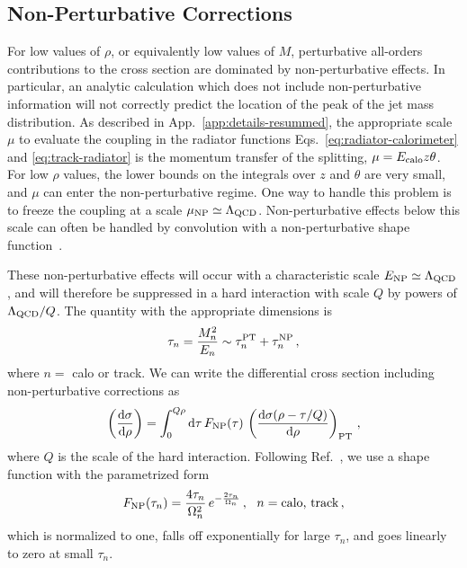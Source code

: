 \documentclass[letterpaper,11pt]{article}
\newcommand{\Ref}[1]{Ref.~\cite{#1}}
\newcommand{\App}[1]{App.~\ref{#1}}
\newcommand{\Eqs}[2]{Eqs.~\eqref{#1} and \eqref{#2}}
\begin{document}

\subsection{Non-Perturbative Corrections}
\label{sec:calculation-np}


For low values of $\rho$, or equivalently low values of $M$, perturbative all-orders contributions to the cross section are dominated by non-perturbative effects. 
%
In particular, an analytic calculation which does not include non-perturbative information will not correctly predict the location of the peak of the jet mass distribution. 
As described in \App{app:details-resummed}, the appropriate scale $\mu$ to evaluate the coupling in the radiator functions \Eqs{eq:radiator-calorimeter}{eq:track-radiator} is the momentum transfer of the splitting, $\mu = E_{\rm calo}z\theta$. 
%
For low $\rho$ values, the lower bounds on the integrals over $z$ and $\theta$ are very small, and $\mu$ can enter the non-perturbative regime. 
%
One way to handle this problem is to freeze the coupling at a scale $\mu_{\rm NP} \simeq \Lambda_{\rm QCD}$. 
%
Non-perturbative effects below this scale can often be handled by convolution with a non-perturbative shape function~\cite{Manohar:1994kq,Dokshitzer:1995zt,Korchemsky:1999kt,Korchemsky:2000kp,Salam:2001bd,Lee:2006nr,Hoang:2007vb,Mateu:2012nk,Stewart:2014nna}. 


These non-perturbative effects will occur with a characteristic scale $E_{\rm NP} \simeq \Lambda_{\rm QCD}$, and will therefore be suppressed in a hard interaction with scale $Q$ by powers of $\Lambda_{\rm QCD}/Q$. 
%
The quantity with the appropriate dimensions is
\begin{equation}
\label{eq:tau-defn}
\tau_n = \frac{M_n^2}{E_n} \sim \tau_n^{\rm PT} + \tau_n^{\rm NP}\,,
\end{equation}
where $n = $ calo or track.
%
We can write the differential cross section including non-perturbative corrections as
\begin{equation}
\label{eq:shape-fcn-convolution}
\left(\frac{\text{d}\sigma}{\text{d}\rho}\right) = \int_0^{Q\rho} \text{d}\tau \,  F_{\rm NP}(\tau) \, \left(\frac{\text{d}\sigma(\rho -\tau/Q)}{\text{d}\rho}\right)_{\rm PT}\,,
\end{equation}
where $Q$ is the scale of the hard interaction. 
%
Following \Ref{Stewart:2014nna}, we use a shape function with the parametrized form 
\begin{equation}
\label{eq:shape-functions}
F_{\rm NP}(\tau_n) = \frac{4\tau_n}{\Omega_n^2}\, e^{-\frac{2\tau_n}{\Omega_n}}\,, \ \ n=\mbox{calo, track}\,,
\end{equation}
which is normalized to one, falls off exponentially for large $\tau_n$, and goes linearly to zero at small $\tau_n$. 
\end{document}
